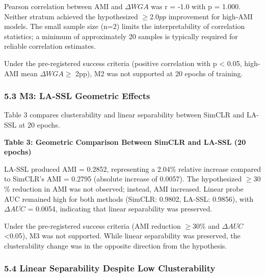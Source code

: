 Pearson correlation between AMI and $\Delta WGA$ was r = -1.0 with p = 1.000. Neither stratum achieved the hypothesized $\geq 2.0pp$ improvement for high-AMI models. The small sample size (n=2) limits the interpretability of correlation statistics; a minimum of approximately 20 samples is typically required for reliable correlation estimates.

Under the pre-registered success criteria (positive correlation with p < 0.05, high-AMI mean $\Delta WGA \geq$ 2pp), M2 was not supported at 20 epochs of training.

\subsubsection{5.3 M3: LA-SSL Geometric Effects}

Table 3 compares clusterability and linear separability between SimCLR and LA-SSL at 20 epochs.

\textbf{Table 3: Geometric Comparison Between SimCLR and LA-SSL (20 epochs)}

\begin{table}[htbp]
\centering
{}
\end{table}

LA-SSL produced AMI = 0.2852, representing a 2.04\% relative increase compared to SimCLR's AMI = 0.2795 (absolute increase of 0.0057). The hypothesized $\geq 30$\% reduction in AMI was not observed; instead, AMI increased. Linear probe AUC remained high for both methods (SimCLR: 0.9802, LA-SSL: 0.9856), with $\Delta AUC$ = 0.0054, indicating that linear separability was preserved.

Under the pre-registered success criteria (AMI reduction $\geq 30$\% and $\Delta AUC$ <0.05), M3 was not supported. While linear separability was preserved, the clusterability change was in the opposite direction from the hypothesis.

\subsubsection{5.4 Linear Separability Despite Low Clusterability}

